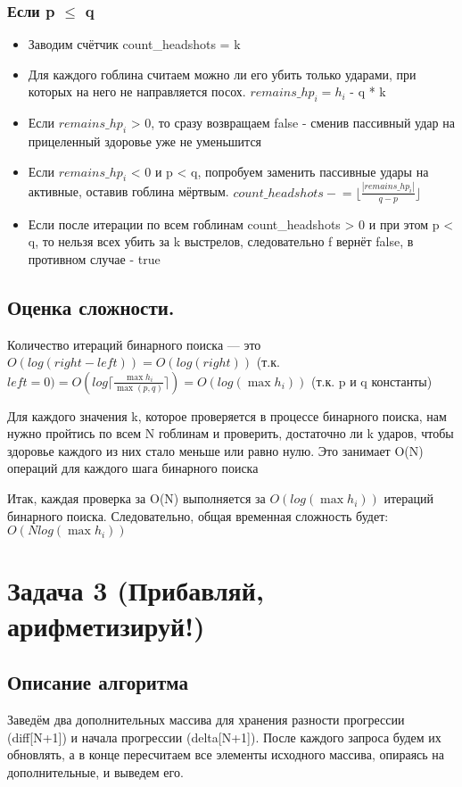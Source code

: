 \documentclass[a4paper,14pt]{article}
\begin{document}
\begin{enumerate}
    \subsubsection{ Если p $\leq$ q }
    \begin{itemize}
        \item Заводим счётчик count\_headshots = k
        \item Для каждого гоблина считаем можно ли его убить только ударами, при которых на него не направляется посох. $remains\_hp_i = h_i$ - q * k
        \item Если $remains\_hp_i$ > 0, то сразу возвращаем false - сменив пассивный удар на прицеленный здоровье уже не уменьшится
        \item Если $remains\_hp_i$ < 0 и p < q, попробуем заменить пассивные удары на активные, оставив гоблина мёртвым. $count\_headshots \mathrel{-}= \lfloor\frac{|remains\_hp_i|}{q - p}\rfloor$
        \item Если после итерации по всем гоблинам count\_headshots > 0 и при этом p < q, то нельзя всех убить за k выстрелов, следовательно f вернёт false, в противном случае - true
    \end{itemize}
    \end{enumerate}

    \subsection{Оценка сложности.}
    Количество итераций бинарного поиска — это $O(log(right - left)) = O(log(right))$ (т.к. $left = 0) = O(log\lceil\frac{\max{h_i}}{\max{(p, q)}}\rceil) = O(log(\max{h_i}))$ (т.к. p и q константы)

    Для каждого значения k, которое проверяется в процессе бинарного поиска, нам нужно пройтись по всем N гоблинам и проверить, достаточно ли k ударов, чтобы здоровье каждого из них стало меньше или равно нулю. Это занимает O(N) операций для каждого шага бинарного поиска

    Итак, каждая проверка за O(N) выполняется за $O(log(\max{h_i}))$ итераций бинарного поиска. Следовательно, общая временная сложность будет: $O(Nlog(\max{h_i}))$

\section{Задача 3 (Прибавляй, арифметизируй!)}
\subsection{Описание алгоритма}
Заведём два дополнительных массива для хранения разности прогрессии (diff[N+1]) и начала прогрессии (delta[N+1]). После каждого запроса будем их обновлять, а в конце пересчитаем все элементы исходного массива, опираясь на дополнительные, и выведем его.
\end{document}
